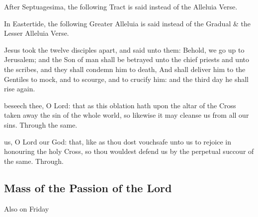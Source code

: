 \begin{rubric}
    After Septuagesima, the following Tract is said instead of the Alleluia Verse.
\end{rubric}


\begin{rubric}
    In Eastertide, the following Greater Alleluia is said instead of the Gradual \& the Lesser Alleluia Verse.
\end{rubric}


 Jesus took the twelve disciples apart, and said unto them: Behold, we go up to Jerusalem; and the Son of man shall be betrayed unto the chief priests and unto the scribes, and they shall condemn him to death, And shall deliver him to the Gentiles to mock, and to scourge, and to crucify him: and the third day he shall rise again.


\secret
{} beseech thee, O Lord: that as this oblation hath upon the altar of the Cross taken away the sin of the whole world, so likewise it may cleanse us from all our sins. Through the same.


\postcommunion
{} us, O Lord our God: that, like as thou dost vouchsafe unto us to rejoice in honouring the holy Cross, so thou wouldest defend us by the perpetual succour of the same.  Through.


\subsection{Mass of the Passion of the Lord}
\begin{inhead}
	Also on Friday
\end{inhead}

